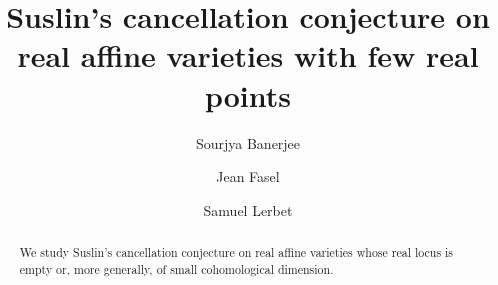 \documentclass[11pt,leqno]{amsart}
\renewcommand{\1}{{\rm 1\hspace*{-0.4ex}%
\rule{0.1ex}{1.52ex}\hspace*{0.2ex}}}
\newcommand{\<}[1]{{\langle}#1 {\rangle}}
\theoremstyle{plain}
\theoremstyle{definition}
\theoremstyle{remark}
\numberwithin{equation}{section}
\begin{document}
\pagestyle{fancy}
\renewcommand{\sectionmark}[1]{\markright{\thesection\ #1}}
\fancyhead{}
\fancyhead[LO,R]{\bfseries\footnotesize\thepage}
\fancyhead[LE]{\bfseries\footnotesize\rightmark}
\fancyhead[RO]{\bfseries\footnotesize\rightmark}
\chead[]{}
\cfoot[]{}
\setlength{\headheight}{1cm}



\title[Suslin's cancellation conjecture on varieties with few real points]{{\bf Suslin's cancellation conjecture on real affine varieties with few real points}}
\date{}
\author{Sourjya Banerjee}
\address{Sourjya Banerjee \\
Department of Mathematics \\ 
Indian Institute of Technology Hyderabad \\
 Kandi, Sangareddy, Telangana \\
 502284, India} 
\author{Jean Fasel}
\address{Jean Fasel \\
Universit\'e Grenoble Alpes \\
Institut Fourier \\
CS 40700 \\
38058 Grenoble Cedex 9 \\
France} 
\author{Samuel Lerbet}
\address{Samuel Lerbet \\
DMA, École normale supérieure, Université PSL, CNRS\\
75005 Paris\\
France} 

\maketitle

\begin{abstract}
We study Suslin's cancellation conjecture on real affine varieties whose real locus is empty or, more generally, of small cohomological dimension.
\end{abstract}
\end{document}
